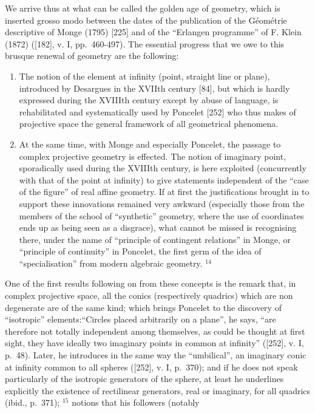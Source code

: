 We arrive thus at what can be called the golden age of geometry, which is inserted grosso modo between the dates of the publication of the Géométrie descriptive of Monge (1795) {[}225{]} and of the ``Erlangen programme'' of F. Klein (1872) ({[}182{]}, v. I, pp.~460-497). The essential progress that we owe to this brusque renewal of geometry are the following:

\begin{enumerate}
\def\labelenumi{\Alph{enumi})}
\item
  The notion of the element at infinity (point, straight line or plane), introduced by Desargues in the XVIIth century {[}84{]}, but which is hardly expressed during the XVIIIth century except by abuse of language, is rehabilitated and systematically used by Poncelet {[}252{]} who thus makes of projective space the general framework of all geometrical phenomena.
\item
  At the same time, with Monge and especially Poncelet, the passage to complex projective geometry is effected. The notion of imaginary point, sporadically used during the XVIIIth century, is here exploited (concurrently with that of the point at infinity) to give statements independent of the ``case of the figure'' of real affine geometry. If at first the justifications brought in to support these innovations remained very awkward (especially those from the members of the school of ``synthetic'' geometry, where the use of coordinates ends up as being seen as a disgrace), what cannot be missed is recognising there, under the name of ``principle of contingent relations'' in Monge, or ``principle of continuity'' in Poncelet, the first germ of the idea of ``specialisation'' from modern algebraic geometry. \(^{14}\)
\end{enumerate}

One of the first results following on from these concepts is the remark that, in complex projective space, all the conics (respectively quadrics) which are non degenerate are of the same kind; which brings Poncelet to the discovery of ``isotropic'' elements:``Circles placed arbitrarily on a plane'', he says, ``are therefore not totally independent among themselves, as could be thought at first sight, they have ideally two imaginary points in common at infinity'' ({[}252{]}, v. I, p.~48). Later, he introduces in the same way the ``umbilical'', an imaginary conic at infinity common to all spheres ({[}252{]}, v. I, p.~370); and if he does not speak particularly of the isotropic generators of the sphere, at least he underlines explicitly the existence of rectilinear generators, real or imaginary, for all quadrics (ibid., p.~371); \(^{15}\) notions that his followers (notably

